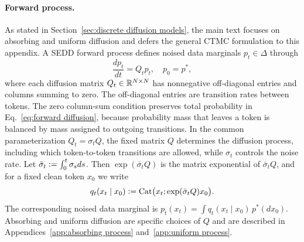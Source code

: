 \paragraph{Forward process.}
As stated in Section~\ref{sec:discrete diffusion models}, the main text focuses on absorbing and uniform diffusion and defers the general CTMC formulation to this appendix. A SEDD forward process defines noised data marginals $p_t\in\Delta$ through
\begin{equation}
    \frac{dp_t}{dt} = Q_t p_t, \quad p_0 = p^*,
    \label{eq:forward diffusion}
\end{equation}
where each diffusion matrix $Q_t \in \mathbb{R}^{N \times N}$ has nonnegative off-diagonal entries and columns summing to zero. The off-diagonal entries are transition rates between tokens. The zero column-sum condition preserves total probability in Eq.~\eqref{eq:forward diffusion}, because probability mass that leaves a token is balanced by mass assigned to outgoing transitions. In the common parameterization $Q_t=\sigma_t Q$, the fixed matrix $Q$ determines the diffusion process, including which token-to-token transitions are allowed, while $\sigma_t$ controls the noise rate. Let $\bar{\sigma}_t \vcentcolon= \int_0^t \sigma_s ds$. Then $\exp(\bar{\sigma}_t Q)$ is the matrix exponential of $\bar{\sigma}_t Q$, and for a fixed clean token $x_0$ we write
\begin{equation}
    q_t(x_t \mid x_0)
    \vcentcolon= \mathrm{Cat}\bigl(x_t;\exp(\bar{\sigma}_t Q)x_0\bigr).
    \label{eq:conditional_distribution}
\end{equation}
The corresponding noised data marginal is $p_t(x_t)=\int q_t(x_t\mid x_0)\,p^*(dx_0)$. Absorbing and uniform diffusion are specific choices of $Q$ and are described in Appendices~\ref{app:absorbing process} and~\ref{app:uniform process}.

